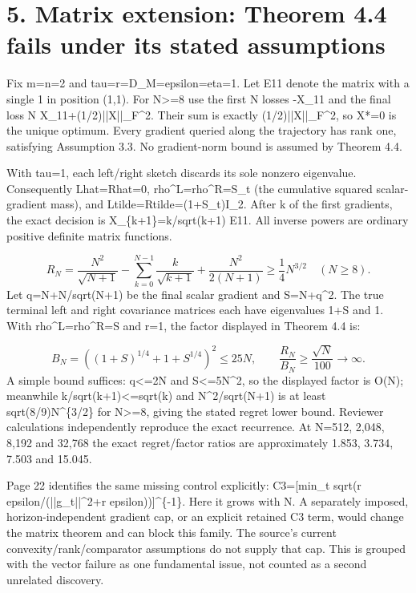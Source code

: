 \documentclass[10pt]{article}
\begin{document}
\section*{5. Matrix extension: Theorem 4.4 fails under its stated assumptions}
Fix m=n=2 and tau=r=D\_M=epsilon=eta=1. Let E11 denote the matrix with a single 1 in position (1,1). For N>=8 use the first N losses -X\_11 and the final loss N X\_11+(1/2)||X||\_F\textasciicircum{}2. Their sum is exactly (1/2)||X||\_F\textasciicircum{}2, so X*=0 is the unique optimum. Every gradient queried along the trajectory has rank one, satisfying Assumption 3.3. No gradient-norm bound is assumed by Theorem 4.4.\par
With tau=1, each left/right sketch discards its sole nonzero eigenvalue. Consequently Lhat=Rhat=0, rho\textasciicircum{}L=rho\textasciicircum{}R=S\_t (the cumulative squared scalar-gradient mass), and Ltilde=Rtilde=(1+S\_t)I\_2. After k of the first gradients, the exact decision is X\_\{k+1\}=k/sqrt(k+1) E11. All inverse powers are ordinary positive definite matrix functions.\par
\[R_N=\frac{N^2}{\sqrt{N+1}}-\sum_{k=0}^{N-1}\frac{k}{\sqrt{k+1}}+\frac{N^2}{2(N+1)}\ge\frac14N^{3/2}\quad(N\ge8).\] Let q=N+N/sqrt(N+1) be the final scalar gradient and S=N+q\textasciicircum{}2. The true terminal left and right covariance matrices each have eigenvalues 1+S and 1. With rho\textasciicircum{}L=rho\textasciicircum{}R=S and r=1, the factor displayed in Theorem 4.4 is:\par
\[B_N=\left((1+S)^{1/4}+1+S^{1/4}\right)^2\le25N,\qquad \frac{R_N}{B_N}\ge\frac{\sqrt N}{100}\longrightarrow\infty.\] A simple bound suffices: q<=2N and S<=5N\textasciicircum{}2, so the displayed factor is O(N); meanwhile k/sqrt(k+1)<=sqrt(k) and N\textasciicircum{}2/sqrt(N+1) is at least sqrt(8/9)N\textasciicircum{}\{3/2\} for N>=8, giving the stated regret lower bound. Reviewer calculations independently reproduce the exact recurrence. At N=512, 2,048, 8,192 and 32,768 the exact regret/factor ratios are approximately 1.853, 3.734, 7.503 and 15.045.\par
Page 22 identifies the same missing control explicitly: C3=[min\_t sqrt(r epsilon/(||g\_t||\textasciicircum{}2+r epsilon))]\textasciicircum{}\{-1\}. Here it grows with N. A separately imposed, horizon-independent gradient cap, or an explicit retained C3 term, would change the matrix theorem and can block this family. The source’s current convexity/rank/comparator assumptions do not supply that cap. This is grouped with the vector failure as one fundamental issue, not counted as a second unrelated discovery.\par
\end{document}
